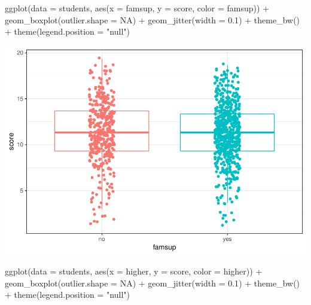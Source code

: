 \documentclass[]{article}
\newenvironment{Shaded}{\begin{snugshade}}{\end{snugshade}}
\newcommand{\DataTypeTok}[1]{\textcolor[rgb]{0.87,0.87,0.75}{#1}}
\newcommand{\FloatTok}[1]{\textcolor[rgb]{0.75,0.75,0.82}{#1}}
\newcommand{\KeywordTok}[1]{\textcolor[rgb]{0.94,0.87,0.69}{#1}}
\newcommand{\NormalTok}[1]{\textcolor[rgb]{0.80,0.80,0.80}{#1}}
\newcommand{\OperatorTok}[1]{\textcolor[rgb]{0.94,0.94,0.82}{#1}}
\newcommand{\OtherTok}[1]{\textcolor[rgb]{0.94,0.94,0.56}{#1}}
\newcommand{\StringTok}[1]{\textcolor[rgb]{0.80,0.58,0.58}{#1}}
\begin{document}
\begin{Shaded}
\begin{Highlighting}[]
\KeywordTok{ggplot}\NormalTok{(}\DataTypeTok{data =}\NormalTok{ students, }\KeywordTok{aes}\NormalTok{(}\DataTypeTok{x =}\NormalTok{ famsup, }\DataTypeTok{y =}\NormalTok{ score, }\DataTypeTok{color =}\NormalTok{ famsup)) }\OperatorTok{+}
\StringTok{  }\KeywordTok{geom_boxplot}\NormalTok{(}\DataTypeTok{outlier.shape =} \OtherTok{NA}\NormalTok{) }\OperatorTok{+}
\StringTok{  }\KeywordTok{geom_jitter}\NormalTok{(}\DataTypeTok{width =} \FloatTok{0.1}\NormalTok{) }\OperatorTok{+}
\StringTok{  }\KeywordTok{theme_bw}\NormalTok{() }\OperatorTok{+}
\StringTok{  }\KeywordTok{theme}\NormalTok{(}\DataTypeTok{legend.position =} \StringTok{"null"}\NormalTok{)}
\end{Highlighting}
\end{Shaded}

\includegraphics{Practica2_files/figure-latex/unnamed-chunk-53-3.pdf}

\begin{Shaded}
\begin{Highlighting}[]
\KeywordTok{ggplot}\NormalTok{(}\DataTypeTok{data =}\NormalTok{ students, }\KeywordTok{aes}\NormalTok{(}\DataTypeTok{x =}\NormalTok{ higher, }\DataTypeTok{y =}\NormalTok{ score, }\DataTypeTok{color =}\NormalTok{ higher)) }\OperatorTok{+}
\StringTok{  }\KeywordTok{geom_boxplot}\NormalTok{(}\DataTypeTok{outlier.shape =} \OtherTok{NA}\NormalTok{) }\OperatorTok{+}
\StringTok{  }\KeywordTok{geom_jitter}\NormalTok{(}\DataTypeTok{width =} \FloatTok{0.1}\NormalTok{) }\OperatorTok{+}
\StringTok{  }\KeywordTok{theme_bw}\NormalTok{() }\OperatorTok{+}
\StringTok{  }\KeywordTok{theme}\NormalTok{(}\DataTypeTok{legend.position =} \StringTok{"null"}\NormalTok{)}
\end{Highlighting}
\end{Shaded}
\end{document}
